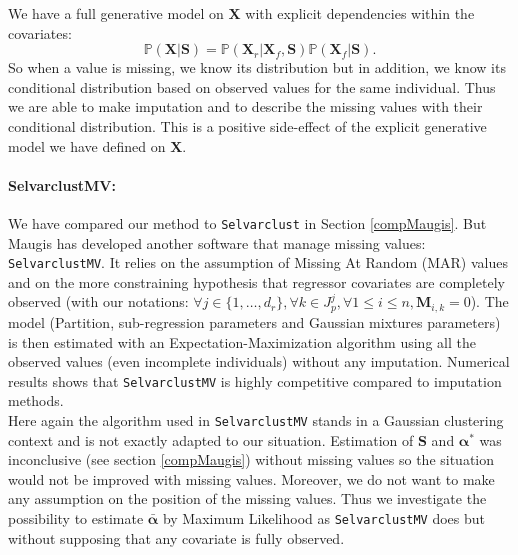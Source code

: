 \documentclass[12pt,a4paper]{report}
\begin{document}
%	 
%	 
	We have a full generative model on $\boldsymbol{X}$ with explicit dependencies within the covariates:
	\begin{equation*}
	\mathbb{P}(\boldsymbol{X}|\boldsymbol{S})=\mathbb{P}(\boldsymbol{X}_r|\boldsymbol{X}_f,\boldsymbol{S})\mathbb{P}(\boldsymbol{X}_f|\boldsymbol{S}).
\end{equation*}	 
So when a value is missing, we know its distribution but in addition, we know its conditional distribution based on observed values for the same individual. Thus we are able to make imputation and to describe the missing values with their conditional distribution. This is a positive side-effect of the explicit generative model we have defined on $\boldsymbol{X}$.\\
		
	\paragraph{SelvarclustMV:} We have compared our method to {\tt Selvarclust} in Section \ref{compMaugis}. But Maugis  has developed another software \cite{maugis2012selvarclustmv} that manage missing values: {\tt SelvarclustMV}. It relies on the assumption of Missing At Random (MAR) values and on the more constraining hypothesis that regressor covariates are completely observed (with our notations: $\forall j \in \{1,\dots,d_r \}, \forall k \in J_p^j, \forall 1\leq i \leq n, \boldsymbol{M}_{i,k}=0$). The model (Partition, sub-regression parameters and Gaussian mixtures parameters) is then estimated with an Expectation-Maximization algorithm using all the observed values (even incomplete individuals) without any imputation. Numerical results shows that {\tt SelvarclustMV} is highly competitive compared to imputation methods.\\
 Here again the algorithm used in {\tt SelvarclustMV} stands in a Gaussian clustering context and is not exactly adapted to our situation. Estimation of $\boldsymbol{S}$ and $\boldsymbol{\alpha}^*$ was inconclusive (see section \ref{compMaugis}) without missing values so the situation would not be improved with missing values.
 Moreover, we do not want to make any assumption on the position of the missing values. Thus we investigate the possibility to estimate $\bar{\boldsymbol{\alpha}}$ by Maximum Likelihood as {\tt SelvarclustMV} does but without supposing that any covariate is fully observed.\\
	
\end{document}
